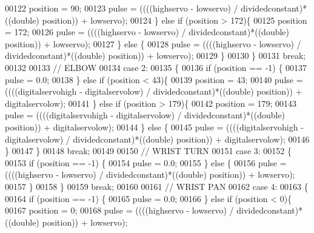 \begin{DoxyCode}
00122                 position = 90;
00123                 pulse = ((((highservo - lowservo) / dividedconstant)*((double) position)) + lowservo);
00124             \} \textcolor{keywordflow}{else} \textcolor{keywordflow}{if} (position > 172)\{
00125                 position = 172;
00126                 pulse = ((((highservo - lowservo) / dividedconstant)*((double) position)) + lowservo);
00127             \} \textcolor{keywordflow}{else} \{
00128                 pulse = ((((highservo - lowservo) / dividedconstant)*((double) position)) + lowservo);
00129             \}
00130         \}
00131             \textcolor{keywordflow}{break};
00132 
00133             \textcolor{comment}{// ELBOW}
00134         \textcolor{keywordflow}{case} 2:
00135         \{
00136             \textcolor{keywordflow}{if} (position == -1) \{
00137                 pulse = 0.0;
00138             \} \textcolor{keywordflow}{else} \textcolor{keywordflow}{if} (position < 43)\{
00139                 position = 43;
00140                 pulse = ((((digitalservohigh - digitalservolow) / dividedconstant)*((double) position)) + 
      digitalservolow);
00141             \} \textcolor{keywordflow}{else} \textcolor{keywordflow}{if} (position > 179)\{
00142                 position = 179;
00143                 pulse = ((((digitalservohigh - digitalservolow) / dividedconstant)*((double) position)) + 
      digitalservolow);
00144             \} \textcolor{keywordflow}{else} \{
00145                 pulse = ((((digitalservohigh - digitalservolow) / dividedconstant)*((double) position)) + 
      digitalservolow);
00146             \}
00147         \}
00148             \textcolor{keywordflow}{break};
00149 
00150             \textcolor{comment}{// WRIST TURN}
00151         \textcolor{keywordflow}{case} 3:
00152         \{
00153             \textcolor{keywordflow}{if} (position == -1) \{
00154                 pulse = 0.0;
00155             \} \textcolor{keywordflow}{else} \{
00156                 pulse = ((((highservo - lowservo) / dividedconstant)*((double) position)) + lowservo);
00157             \}
00158         \}
00159             \textcolor{keywordflow}{break};
00160 
00161             \textcolor{comment}{// WRIST PAN}
00162         \textcolor{keywordflow}{case} 4:
00163         \{
00164             \textcolor{keywordflow}{if} (position == -1) \{
00165                 pulse = 0.0;
00166             \} \textcolor{keywordflow}{else} \textcolor{keywordflow}{if} (position < 0)\{
00167                 position = 0;
00168                 pulse = ((((highservo - lowservo) / dividedconstant)*((double) position)) + lowservo);

\end{DoxyCode}
